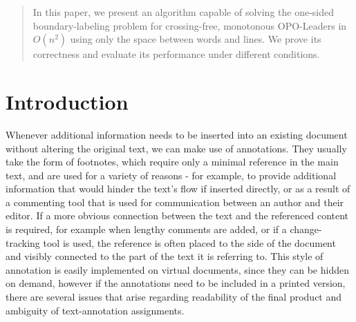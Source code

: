 \documentclass[11pt,a4paper]{vutinfth}
\begin{document}
\frontmatter
\addstatementpage




\begin{abstract}
	In this paper, we present an algorithm capable of solving the one-sided boundary-labeling problem for crossing-free, monotonous OPO-Leaders in $O(n^2)$ using only the space between words and lines. We prove its correctness and evaluate its performance under different conditions.
\end{abstract}


\tableofcontents

\mainmatter




\chapter{Introduction}
Whenever additional information needs to be inserted into an existing document without altering the original text, we can make use of annotations. They usually take the form of footnotes, which require only a minimal reference in the main text, and are used for a variety of reasons - for example, to provide additional information that would hinder the text's flow if inserted directly, or as a result of a commenting tool that is used for communication between an author and their editor.
If a more obvious connection between the text and the referenced content is required, for example when lengthy comments are added, or if a change-tracking tool is used, the reference is often placed to the side of the document and visibly connected to the part of the text it is referring to. This style of annotation is easily implemented on virtual documents, since they can be hidden on demand, however if the annotations need to be included in a printed version, there are several issues that arise regarding readability of the final product and ambiguity of text-annotation assignments.
\end{document}
